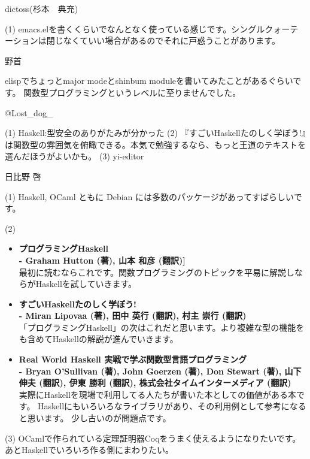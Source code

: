\begin{prework}{ dictoss(杉本　典充) }

(1) emacs.elを書くくらいでなんとなく使っている感じです。シングルクォーテーションは閉じなくていい場合があるのでそれに戸惑うことがあります。
\end{prework}

\begin{prework}{ 野首 }

elispでちょっとmajor modeとshinbum moduleを書いてみたことがあるぐらいです。
関数型プログラミングというレベルに至りませんでした。

\end{prework}

\begin{prework}{ @Lost\_dog\_ }

 (1) Haskell:型安全のありがたみが分かった
 (2) 『すごいHaskellたのしく学ぼう!』は関数型の雰囲気を俯瞰できる。本気で勉強するなら、もっと王道のテキストを選んだほうがよいかも。
 (3) yi-editor
\end{prework}

\begin{prework}{ 日比野 啓 }

(1) Haskell, OCaml ともに Debian には多数のパッケージがあってすばらしいです。

(2)
\begin{itemize}
\item {\bf プログラミングHaskell\\ - Graham Hutton (著), 山本 和彦 (翻訳)]}\\
最初に読むならこれです。関数プログラミングのトピックを平易に解説しならがHaskellを試していきます。
\item {\bf すごいHaskellたのしく学ぼう!\\ - Miran Lipovaa (著), 田中 英行 (翻訳), 村主 崇行 (翻訳)}\\
「プログラミングHaskell」の次はこれだと思います。より複雑な型の機能をも含めてHaskellの解説が進んでいきます。
\item {\bf Real World Haskell 実戦で学ぶ関数型言語プログラミング\\
 - Bryan O'Sullivan (著), John Goerzen (著), Don Stewart (著), 山下 伸夫 (翻訳), 伊東 勝利 (翻訳), 株式会社タイムインターメディア (翻訳)}\\
実際にHaskellを現場で利用してる人たちが書いた本としての価値がある本です。
Haskellにもいろいろなライブラリがあり、その利用例として参考になると思います。
少し古いのが問題点です。
\end{itemize}

(3) OCamlで作られている定理証明器Coqをうまく使えるようになりたいです。あとHaskellでいろいろ作る側にまわりたい。

\end{prework}
